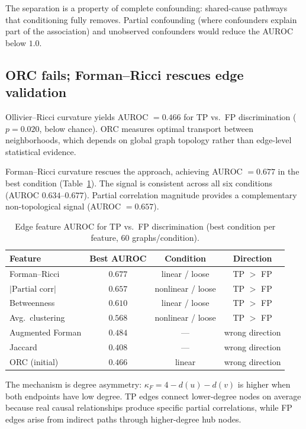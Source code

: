 \documentclass[11pt]{article}
\begin{document}
The separation is a property of complete confounding: shared-cause pathways that conditioning fully removes.
Partial confounding (where confounders explain part of the association) and unobserved confounders would reduce the AUROC below $1.0$.

\subsection{ORC fails; Forman--Ricci rescues edge validation}
\label{sec:res-curvature}

Ollivier--Ricci curvature yields AUROC $= 0.466$ for TP vs.\ FP discrimination ($p = 0.020$, below chance).
ORC measures optimal transport between neighborhoods, which depends on global graph topology rather than edge-level statistical evidence.

Forman--Ricci curvature rescues the approach, achieving AUROC $= 0.677$ in the best condition (Table~\ref{tab:curvature}).
The signal is consistent across all six conditions (AUROC $0.634$--$0.677$).
Partial correlation magnitude provides a complementary non-topological signal (AUROC $= 0.657$).

\begin{table}[t]
\centering
\caption{Edge feature AUROC for TP vs.\ FP discrimination (best condition per feature, 60 graphs/condition).}
\label{tab:curvature}
\small
\begin{tabular}{@{}lccc@{}}
\toprule
\textbf{Feature} & \textbf{Best AUROC} & \textbf{Condition} & \textbf{Direction} \\
\midrule
Forman--Ricci & $\mathbf{0.677}$ & linear / loose & TP $>$ FP \\
$|\text{Partial corr}|$ & $0.657$ & nonlinear / loose & TP $>$ FP \\
Betweenness & $0.610$ & linear / loose & TP $>$ FP \\
Avg.\ clustering & $0.568$ & nonlinear / loose & TP $>$ FP \\
Augmented Forman & $0.484$ & --- & wrong direction \\
Jaccard & $0.408$ & --- & wrong direction \\
\midrule
ORC (initial) & $0.466$ & linear & wrong direction \\
\bottomrule
\end{tabular}
\end{table}

The mechanism is degree asymmetry: $\kappa_F = 4 - d(u) - d(v)$ is higher when both endpoints have low degree.
TP edges connect lower-degree nodes on average because real causal relationships produce specific partial correlations, while FP edges arise from indirect paths through higher-degree hub nodes.
\end{document}
